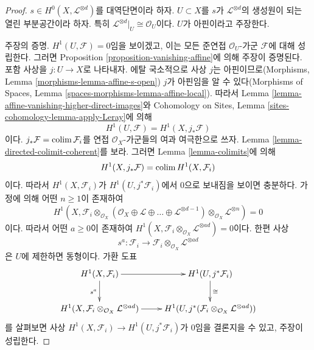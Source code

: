 \begin{proof}
$s \in H^0(X, \mathcal{L}^{\otimes d})$를 대역단면이라 하자.
$U \subset X$를 $s$가 $\mathcal{L}^{\otimes d}$의 생성원이 되는 열린
부분공간이라 하자. 특히 $\mathcal{L}^{\otimes d}|_U \cong \mathcal{O}_U$이다.
$U$가 아핀이라고 주장한다.

\medskip\noindent
주장의 증명. $H^1(U, \mathcal{F}) = 0$임을 보이겠고, 이는 모든 준연접
$\mathcal{O}_U$-가군 $\mathcal{F}$에 대해 성립한다. 그러면 Proposition
\ref{proposition-vanishing-affine}에 의해 주장이 증명된다.
포함 사상을 $j : U \to X$로 나타내자. 에탈 국소적으로 사상 $j$는
아핀이므로(Morphisms, Lemma \ref{morphisms-lemma-affine-s-open})
$j$가 아핀임을 알 수 있다(Morphisms of Spaces, Lemma
\ref{spaces-morphisms-lemma-affine-local}). 따라서 Lemma
\ref{lemma-affine-vanishing-higher-direct-images}와 Cohomology on Sites,
Lemma \ref{sites-cohomology-lemma-apply-Leray}에 의해
$$
H^1(U, \mathcal{F}) = H^1(X, j_*\mathcal{F})
$$
이다. $j_*\mathcal{F} = \mathop{\mathrm{colim}}\nolimits \mathcal{F}_i$를 연접
$\mathcal{O}_X$-가군들의 여과 여극한으로 쓰자. Lemma
\ref{lemma-directed-colimit-coherent}를 보라. 그러면 Lemma
\ref{lemma-colimits}에 의해
$$
H^1(X, j_*\mathcal{F}) = \mathop{\mathrm{colim}}\nolimits H^1(X, \mathcal{F}_i)
$$
이다. 따라서 $H^1(X, \mathcal{F}_i)$가
$H^1(U, j^*\mathcal{F}_i)$에서 0으로 보내짐을 보이면 충분하다.
가정에 의해 어떤 $n \geq 1$이 존재하여
$$
H^1(X,
\mathcal{F}_i \otimes_{\mathcal{O}_X}
(\mathcal{O}_X \oplus \mathcal{L} \oplus \ldots
\oplus \mathcal{L}^{\otimes d - 1})
\otimes_{\mathcal{O}_X} \mathcal{L}^{\otimes n}) = 0
$$
이다. 따라서 어떤 $a \geq 0$이 존재하여
$H^1(X, \mathcal{F}_i \otimes_{\mathcal{O}_X}
\mathcal{L}^{\otimes ad}) = 0$이다. 한편 사상
$$
s^a : \mathcal{F}_i \longrightarrow
\mathcal{F}_i \otimes_{\mathcal{O}_X} \mathcal{L}^{\otimes ad}
$$
은 $U$에 제한하면 동형이다. 가환 도표
$$
\xymatrix{
H^1(X, \mathcal{F}_i) \ar[r] \ar[d]_{s^a} & H^1(U, j^*\mathcal{F}_i)
\ar[d]^{\cong} \\
H^1(X, \mathcal{F}_i \otimes_{\mathcal{O}_X} \mathcal{L}^{\otimes ad}) \ar[r] &
H^1(U,
j^*(\mathcal{F}_i \otimes_{\mathcal{O}_X} \mathcal{L}^{\otimes ad}))
}
$$
를 살펴보면 사상 $H^1(X, \mathcal{F}_i) \to
H^1(U, j^*\mathcal{F}_i)$가 0임을 결론지을 수 있고, 주장이 성립한다.


\end{proof}
